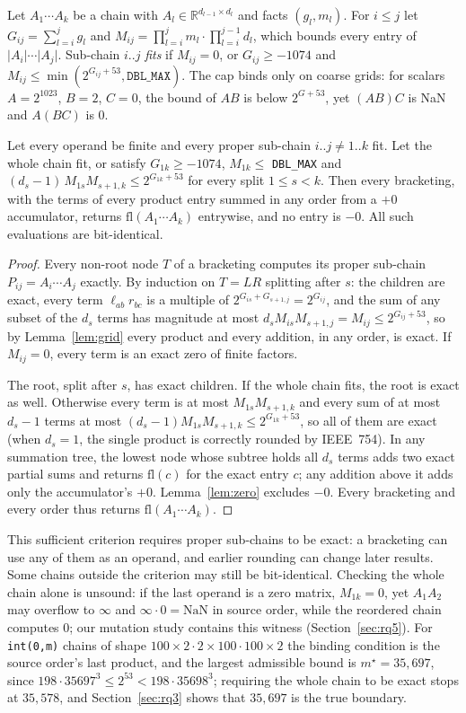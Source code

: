 \documentclass[acmsmall,review,anonymous,nonacm]{acmart}
\newcommand{\fl}{\mathrm{fl}}
\newcommand{\abs}[1]{\lvert #1\rvert}
\begin{document}
Let $A_1\cdots A_k$ be a chain with $A_l\in\mathbb{R}^{d_{l-1}\times d_l}$ and
facts $(g_l, m_l)$. For $i\le j$ let $G_{ij}=\sum_{l=i}^{j}g_l$ and
$M_{ij}=\prod_{l=i}^{j}m_l\cdot\prod_{l=i}^{j-1}d_l$, which bounds every entry of
$\abs{A_i}\cdots\abs{A_j}$. Sub-chain $i..j$ \emph{fits} if $M_{ij}=0$, or
$G_{ij}\ge-1074$ and $M_{ij}\le\min(2^{G_{ij}+53},\texttt{DBL\_MAX})$. The cap
binds only on coarse grids: for scalars $A=2^{1023}$, $B=2$, $C=0$, the bound
of $AB$ is below $2^{G+53}$, yet $(AB)C$ is NaN and $A(BC)$ is $0$.

\begin{theorem}\label{thm:exact}
Let every operand be finite and every proper sub-chain $i..j\ne1..k$ fit. Let
the whole chain fit, or satisfy $G_{1k}\ge-1074$, $M_{1k}\le$
\texttt{DBL\_MAX} and $(d_s-1)\,M_{1s}M_{s+1,k}\le2^{G_{1k}+53}$ for every split
$1\le s<k$. Then every bracketing, with the terms of every product entry summed
in any order from a $+0$ accumulator, returns $\fl(A_1\cdots A_k)$ entrywise, and
no entry is $-0$. All such evaluations are bit-identical.
\end{theorem}
\begin{proof}
Every non-root node $T$ of a bracketing computes its proper sub-chain
$P_{ij}=A_i\cdots A_j$ exactly. By induction on $T=LR$ splitting after $s$: the
children are exact, every term $\ell_{ab}r_{bc}$ is a multiple of
$2^{G_{is}+G_{s+1,j}}=2^{G_{ij}}$, and the sum of any subset of the $d_s$ terms
has magnitude at most $d_sM_{is}M_{s+1,j}=M_{ij}\le2^{G_{ij}+53}$, so by
Lemma~\ref{lem:grid} every product and every addition, in any order, is exact.
If $M_{ij}=0$, every term is an exact zero of finite factors.

The root, split after $s$, has exact children. If the whole chain fits, the root
is exact as well. Otherwise every term is at most $M_{1s}M_{s+1,k}$ and every sum
of at most $d_s-1$ terms at most $(d_s-1)M_{1s}M_{s+1,k}\le2^{G_{1k}+53}$, so all
of them are exact (when $d_s=1$, the single product is correctly rounded by
IEEE~754). In any summation tree, the lowest node whose subtree holds all $d_s$
terms adds two exact partial sums and returns $\fl(c)$ for the exact entry $c$;
any addition above it adds only the accumulator's $+0$. Lemma~\ref{lem:zero}
excludes $-0$. Every bracketing and every order thus returns
$\fl(A_1\cdots A_k)$.
\end{proof}
This sufficient criterion requires proper sub-chains to be exact: a bracketing
can use any of them as an operand, and earlier rounding can change later results.
Some chains outside the criterion may still be bit-identical. Checking the whole
chain alone is unsound: if the last operand is a zero matrix, $M_{1k}=0$, yet $A_1A_2$ may overflow to
$\infty$ and $\infty\cdot0=\mathrm{NaN}$ in source order, while the reordered
chain computes $0$; our mutation study contains this witness
(Section~\ref{sec:rq5}). For \texttt{int(0,m)} chains of shape
$100\times2\cdot2\times100\cdot100\times2$ the binding condition is the source
order's last product, and the largest admissible bound is $m^\star=35{,}697$,
since $198\cdot35697^3\le2^{53}<198\cdot35698^3$; requiring the whole chain to
be exact stops at $35{,}578$, and Section~\ref{sec:rq3} shows that $35{,}697$ is
the true boundary.
\end{document}
